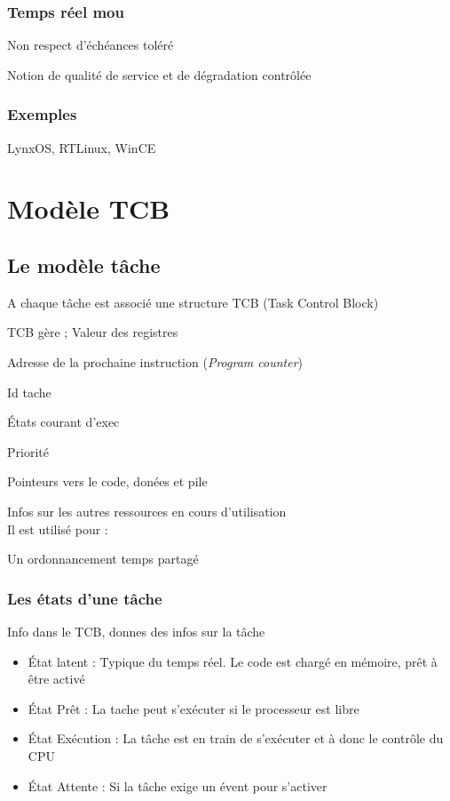 \documentclass[11pt]{article}
\begin{document}
\subsubsection{Temps réel mou}
Non respect d'échéances toléré

Notion de qualité de service et de dégradation contrôlée

\subsubsection{Exemples}
LynxOS, RTLinux, WinCE

\section{Modèle TCB}
\subsection{Le modèle tâche}
\label{sub:}
A chaque tâche est associé une structure TCB (Task Control Block)

TCB gère ;
	Valeur des registres
	
	Adresse de la prochaine instruction (\emph{Program counter})
	
	Id tache
	
	États courant d'exec
	
	Priorité
	
	Pointeurs vers le code, donées et pile
	
	Infos sur les autres ressources en cours d'utilisation
	\\
	Il est utilisé pour :
	
	Un ordonnancement temps partagé
	
	
	\subsubsection{Les états d'une tâche}
	Info dans le TCB, donnes des infos sur la tâche
	\begin{itemize}
	\item État latent : Typique du temps réel. Le code est chargé en mémoire, prêt à être activé
	\item État Prêt : La tache peut s'exécuter si le processeur est libre
	\item État Exécution : La tâche est en train de s'exécuter et à donc le contrôle du CPU
	\item État Attente : Si la tâche exige un évent pour s'activer
	\end{itemize}
	
\end{document}
